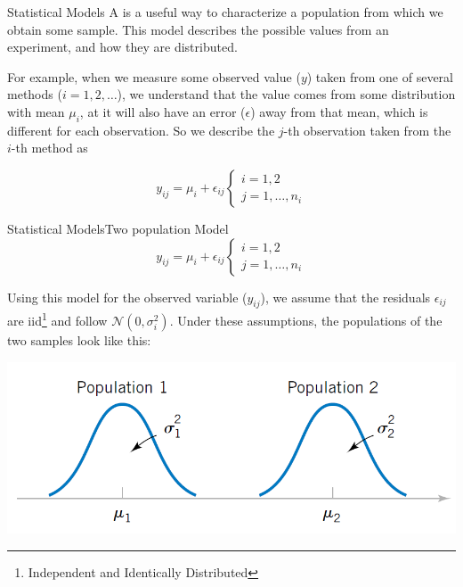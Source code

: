 \begin{frame}{Statistical Models}
  A  is a useful way to characterize a population from which we obtain some sample. This model describes the possible values from an experiment, and how they are distributed.\bigskip

  For example, when we measure some observed value ($y$) taken from one of several methods ($i = 1, 2,\ldots$), we understand that the value comes from some distribution with mean $\mu_i$, at it will also have an error ($\epsilon$) away from that mean, which is different for each observation. So we describe the $j$-th observation taken from the $i$-th method as

  \begin{equation*}
    y_{ij} = \mu_i + \epsilon_{ij}\begin{cases}i=1,2\\j=1,\ldots,n_i\end{cases}
  \end{equation*}
\end{frame}

\begin{frame}{Statistical Models}{Two population Model}
  \begin{equation*}
    y_{ij} = \mu_i + \epsilon_{ij}\begin{cases}i=1,2\\j=1,\ldots,n_i\end{cases}
  \end{equation*}\medskip

  Using this model for the observed variable ($y_{ij}$), we assume that the residuals $\epsilon_{ij}$ are iid\footnote{Independent and Identically Distributed} and follow $\mathcal{N}\left(0,\sigma_i^2\right)$. Under these assumptions, the populations of the two samples look like this:

  \begin{center}
    \includegraphics[width=.6\textwidth]{../img/two_population_model}
  \end{center}
\end{frame}

